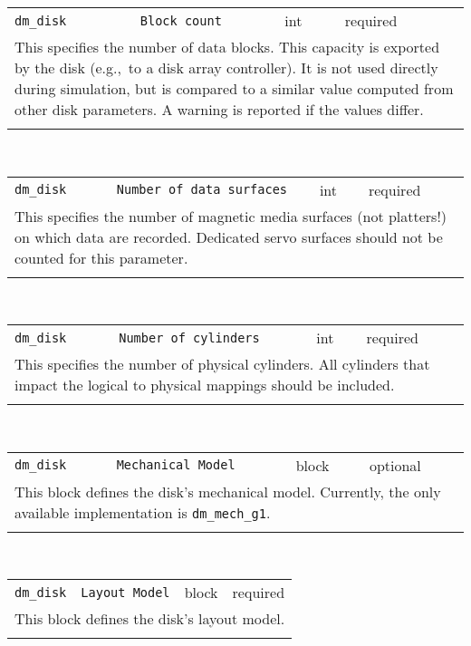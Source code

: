 \noindent 
\begin{tabular}{|p{\lpmodwidth}|p{\lpnamewidth}|p{0.5in}|p{0.5in}|}
\cline{1-4}
\texttt{dm\_disk} & \texttt{Block count} & int & required \\ 
\cline{1-4}
\multicolumn{4}{|p{6in}|}{
This specifies the number of data blocks. This capacity is exported by the
disk (e.g.,~to a disk array controller). It is not used directly
during simulation, but is compared to a similar value computed from
other disk parameters. A warning is reported if the values differ.
}\\ 
\cline{1-4}
\multicolumn{4}{p{5in}}{}\\
\end{tabular}\\ 
\noindent 
\begin{tabular}{|p{\lpmodwidth}|p{\lpnamewidth}|p{0.5in}|p{0.5in}|}
\cline{1-4}
\texttt{dm\_disk} & \texttt{Number of data surfaces} & int & required \\ 
\cline{1-4}
\multicolumn{4}{|p{6in}|}{
This specifies the number of magnetic media surfaces (not platters!) on
which data are recorded. Dedicated servo surfaces should not be
counted for this parameter.
}\\ 
\cline{1-4}
\multicolumn{4}{p{5in}}{}\\
\end{tabular}\\ 
\noindent 
\begin{tabular}{|p{\lpmodwidth}|p{\lpnamewidth}|p{0.5in}|p{0.5in}|}
\cline{1-4}
\texttt{dm\_disk} & \texttt{Number of cylinders} & int & required \\ 
\cline{1-4}
\multicolumn{4}{|p{6in}|}{
This specifies the number of physical cylinders. All cylinders that impact
the logical to physical mappings should be included.
}\\ 
\cline{1-4}
\multicolumn{4}{p{5in}}{}\\
\end{tabular}\\ 
\noindent 
\begin{tabular}{|p{\lpmodwidth}|p{\lpnamewidth}|p{0.5in}|p{0.5in}|}
\cline{1-4}
\texttt{dm\_disk} & \texttt{Mechanical Model} & block & optional \\ 
\cline{1-4}
\multicolumn{4}{|p{6in}|}{
This block defines the disk's mechanical model. Currently,
the only available implementation is \texttt{dm\_mech\_g1}.
}\\ 
\cline{1-4}
\multicolumn{4}{p{5in}}{}\\
\end{tabular}\\ 
\noindent 
\begin{tabular}{|p{\lpmodwidth}|p{\lpnamewidth}|p{0.5in}|p{0.5in}|}
\cline{1-4}
\texttt{dm\_disk} & \texttt{Layout Model} & block & required \\ 
\cline{1-4}
\multicolumn{4}{|p{6in}|}{
This block defines the disk's layout model.
}\\ 
\cline{1-4}
\multicolumn{4}{p{5in}}{}\\
\end{tabular}\\ 
